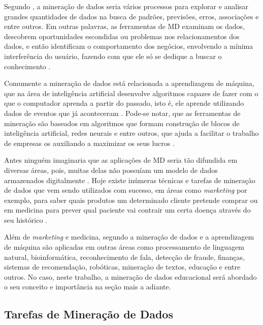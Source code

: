 \par
Segundo , a mineração de dados seria vários processos para explorar e analisar grandes quantidades de dados na busca de padrões, previsões, erros, associações e entre outros. Em outras palavras, as ferramentas de MD examinam os dados, descobrem oportunidades escondidas ou problemas nos relacionamentos dos dados, e então identificam o comportamento dos negócios, envolvendo a mínima interferência do usuário, fazendo com que ele só se dedique a buscar o conhecimento \cite{Jefferson}. 

\par
Comumente a mineração de dados está relacionada a aprendizagem de máquina, que na área de inteligência artificial desenvolve algoritmos capazes de fazer com o que o computador aprenda a partir do passado, isto é, ele aprende utilizando dados de eventos que já aconteceram \cite{Amaral2016}. Pode-se notar, que as ferramentas de mineração são baseados em algoritmos que formam construção de blocos de inteligência artificial, redes neurais e entre outros, que ajuda a facilitar o trabalho de empresas os auxiliando a maximizar os seus lucros \cite{Jefferson}.

\par
Antes ninguém imaginaria que as aplicações de MD seria tão difundida em diversas áreas, pois, muitas delas não possuíam um modelo de dados armazenados digitalmente \cite{Amaral2016}. Hoje existe inúmeras técnicas e tarefas de mineração de dados que vem sendo utilizados com sucesso, em áreas como \textit{marketing} por exemplo, para saber quais produtos um determinado cliente pretende comprar ou em medicina para prever qual paciente vai contrair um certa doença através do seu histórico \cite{Martinhago2005}.

\par
Além de \textit{marketing} e medicina, segundo  a mineração de dados e a aprendizagem de máquina são aplicadas em outras áreas como processamento de linguagem natural, bioinformática, reconhecimento de fala, detecção de fraude,  finanças, sistemas de recomendação, robóticas, mineração de textos, educação e entre outros. No caso, neste trabalho, a mineração de dados educacional será abordado o seu conceito e importância na seção mais a adiante.

\subsection{Tarefas de Mineração de Dados}

